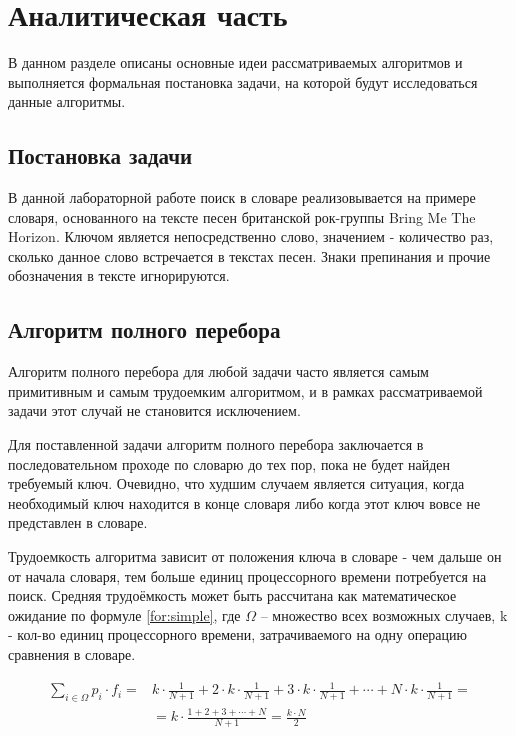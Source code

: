 \chapter{Аналитическая часть}

В данном разделе описаны основные идеи рассматриваемых алгоритмов и выполняется формальная постановка задачи, на которой будут исследоваться данные алгоритмы.

\section{Постановка задачи}

В данной лабораторной работе поиск в словаре реализовывается на примере словаря, основанного на тексте песен британской рок-группы Bring Me The Horizon. Ключом является непосредственно слово, значением - количество раз, сколько данное слово встречается в текстах песен. Знаки препинания и прочие обозначения в тексте игнорируются.

\section{Алгоритм полного перебора}

Алгоритм полного перебора для любой задачи часто является самым примитивным и самым трудоемким алгоритмом, и в рамках рассматриваемой задачи этот случай не становится исключением. 

Для поставленной задачи алгоритм полного перебора заключается в последовательном проходе по словарю до тех пор, пока не будет найден требуемый ключ. Очевидно, что худшим случаем является ситу­ация, когда необходимый ключ находится в конце словаря либо когда этот ключ вовсе не представлен в словаре.

Трудоемкость алгоритма зависит от положения ключа в словаре - чем дальше он от начала словаря, тем больше единиц процессорного времени потребуется на поиск. Средняя трудоёмкость может быть рассчитана как математиче­ское ожидание по формуле \ref{for:simple}, где $\Omega$ – множество всех возможных случаев, k - кол-во единиц процессорного времени, затрачиваемого на одну операцию сравнения в словаре.

\begin{equation}
	\label{for:simple}
	\begin{aligned}
		\sum\limits_{i \in \Omega} p_i \cdot f_i = & k \cdot \frac{1}{N + 1} + 2 \cdot k \cdot \frac{1}{N+1} + 3 \cdot k \cdot \frac{1}{N + 1} + \cdots + N \cdot k \cdot \frac{1}{N + 1} = \\
		& = k \cdot \frac{1 + 2 + 3 + \cdots + N}{N + 1} = \frac{k \cdot N}{2}
	\end{aligned}
\end{equation}

